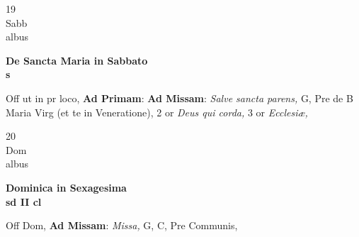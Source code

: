 \documentclass[10pt, openany]{book}
\begin{document}
        \begin{center}
            \begin{minipage}{3.5in}
                \vspace{2em}
                \begin{minipage}{0.5in}
                    {\Huge 19} \\
                    {\normalsize Sabb} \\
                    {\normalsize albus}
                \end{minipage}
                \begin{minipage}{3.0in}
                    \textbf{ \large De Sancta Maria in Sabbato \\
                    \textnormal{\normalsize s}} \\ 
                \end{minipage}
                \begin{justify}Off ut in pr loco, \textbf{Ad Primam}: \textbf{Ad Missam}: \textit{Salve sancta parens,} G, Pre de B Maria Virg (et te in Veneratione), 2 or \textit{Deus qui corda,} 3 or \textit{Ecclesiæ,}   
                \end{justify}
            \end{minipage}
        \end{center}
    
        \begin{center}
            \begin{minipage}{3.5in}
                \vspace{2em}
                \begin{minipage}{0.5in}
                    {\Huge 20} \\
                    {\normalsize Dom} \\
                    {\normalsize albus}
                \end{minipage}
                \begin{minipage}{3.0in}
                    \textbf{ \large Dominica in Sexagesima \\
                    \textnormal{\normalsize sd II cl}} \\ 
                \end{minipage}
                \begin{justify}Off Dom, \textbf{Ad Missam}: \textit{Missa,} G, C, Pre Communis,   
                \end{justify}
            \end{minipage}
        \end{center}
    
\end{document}
